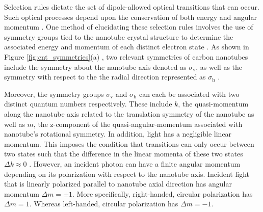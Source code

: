 Selection rules dictate the set of dipole-allowed optical transitions that can occur. Such optical processes depend upon the conservation of both energy and angular momentum \cite{weismanKonoBook}.  One method of elucidating these selection rules involves the use of symmetry groups tied to the nanotube crystal structure to determine the associated energy and momentum of each distinct electron state \cite{bovzovic2000optical}. As shown in Figure \ref{fig:cnt_symmetries}(a) , two relevant symmetries of carbon nanotubes include the symmetry about the nanotube axis denoted as $\sigma_\text{v}$, as well as the symmetry with respect to the the radial direction represented as $\sigma_\text{h}$ \cite{bovzovic2000optical}.


Moreover, the symmetry groups $\sigma_\text{v}$ and $\sigma_\text{h}$ can each be associated with two distinct quantum numbers respectively. These include $k$, the quasi-momentum along the nanotube axis related to the translation symmetry of the nanotube as well as $m$, the z-component of the quasi-angular-momentum associated with nanotube's rotational symmetry.  In addition, light has a negligible linear momentum. This imposes the condition that transitions can only occur between two states such that the difference in the linear momenta of these two states $\Delta k \approx 0 $ \cite{bovzovic2000optical}. However, an incident photon can have a finite angular momentum depending on its polarization with respect to the nanotube axis. Incident light that is linearly polarized parallel to nanotube axial direction has angular momentum $\Delta m = \pm 1$. More specifically, right-handed, circular polarization has $\Delta m = 1$. Whereas left-handed, circular polarization has $\Delta m = -1$.

